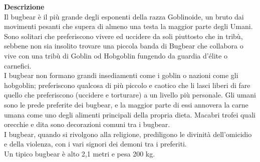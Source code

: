 \begin{multicols}{2}
\textbf{Descrizione}\\
Il bugbear è il più grande degli esponenti della razza Goblinoide, un bruto dai movimenti pesanti che supera di almeno una testa la maggior parte degli Umani. Sono solitari che preferiscono vivere ed uccidere da soli piuttosto che in tribù, sebbene non sia insolito trovare una piccola banda di Bugbear che collabora o vive con una tribù di Goblin od Hobgoblin fungendo da guardia d’élite o carnefici.\\
I bugbear non formano grandi insediamenti come i goblin o nazioni come gli hobgoblin; preferiscono qualcosa di più piccolo e caotico che li lasci liberi di fare quello che preferiscono (uccidere e torturare) a un livello più personale. Gli umani sono le prede preferite dei bugbear, e la maggior parte di essi annovera la carne umana come uno degli alimenti principali della propria dieta. Macabri trofei quali orecchie e dita sono decorazioni comuni tra i bugbear.\\
I bugbear, quando si rivolgono alla religione, prediligono le divinità dell’omicidio e della violenza, con i vari signori dei demoni tra i preferiti.\\
Un tipico bugbear è alto 2,1 metri e pesa 200 kg.\\


\end{multicols}
